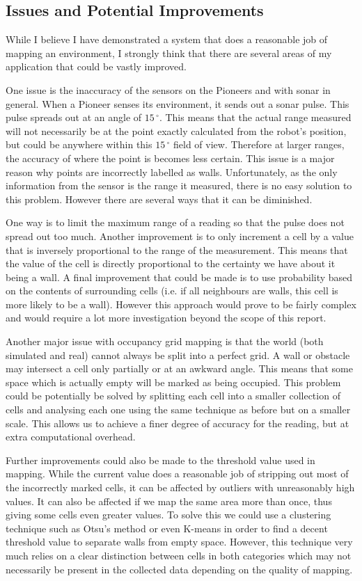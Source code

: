 \documentclass{article}
\begin{document}
\subsection{Issues and Potential Improvements}
\label{sec:issues}
While I believe I have demonstrated a system that does a reasonable job of mapping an environment, I strongly think that there are several areas of my application that could be vastly improved.

One issue is the inaccuracy of the sensors on the Pioneers and with sonar in general. When a Pioneer senses its environment, it sends out a sonar pulse. This pulse spreads out at an angle of $15\,^\circ$. This means that the actual range measured will not necessarily be at the point exactly calculated from the robot's position, but could be anywhere within this $15\,^\circ$ field of view. Therefore at larger ranges, the accuracy of where the point is becomes less certain. This issue is a major reason why points are incorrectly labelled as walls. Unfortunately, as the only information from the sensor is the range it measured, there is no easy solution to this problem. However there are several ways that it can be diminished. 

One way is to limit the maximum range of a reading so that the pulse does not spread out too much. Another improvement is to only increment a cell by a value that is inversely proportional to the range of the measurement. This means that the value of the cell is directly proportional to the certainty we have about it being a wall. A final improvement that could be made is to use probability based on the contents of surrounding cells (i.e. if all neighbours are walls, this cell is more likely to be a wall). However this approach would prove to be fairly complex and would require a lot more investigation beyond the scope of this report.

Another major issue with occupancy grid mapping is that the world (both simulated and real) cannot always be split into a perfect grid. A wall or obstacle may intersect a cell only partially or at an awkward angle. This means that some space which is actually empty will be marked as being occupied. This problem could be potentially be solved by splitting each cell into a smaller collection of cells and analysing each one using the same technique as before but on a smaller scale. This allows us to achieve a finer degree of accuracy for the reading, but at extra computational overhead.

Further improvements could also be made to the threshold value used in mapping. While the current value does a reasonable job of stripping out most of the incorrectly marked cells, it can be affected by outliers with unreasonably high values. It can also be affected if we map the same area more than once, thus giving some cells even greater values. To solve this we could use a clustering technique such as Otsu's method  or even K-means in order to find a decent threshold value to separate walls from empty space. However, this technique very much relies on a clear distinction between cells in both categories which may not necessarily be present in the collected data depending on the quality of mapping.
\end{document}
